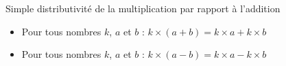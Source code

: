 \documentclass[a4paper,dvipsnames]{article}
\begin{document}

\begin{PpT}{Simple distributivité de la multiplication par rapport à l'addition}
\begin{itemize}
\item Pour tous nombres $k$, $a$ et $b$ : $k\times(a+b)=k\times a+k\times b$
\item Pour tous nombres $k$, $a$ et $b$ : $k\times(a-b)=k\times a-k\times b$
\end{itemize}
\end{PpT}
\end{document}
